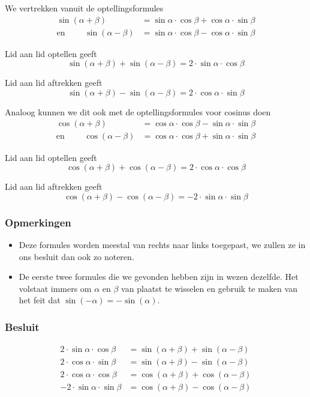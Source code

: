 \documentclass[twoside,a4paper,12pt]{article}
\begin{document}
We vertrekken vanuit de optellingsformules
\begin{align*}
                   \sin(\alpha + \beta) &= \sin\alpha\cdot\cos\beta + \cos\alpha\cdot\sin\beta\\
  \mbox{en }\qquad \sin(\alpha - \beta) &= \sin\alpha\cdot\cos\beta - \cos\alpha\cdot\sin\beta
\end{align*}

Lid aan lid optellen geeft
$$\sin(\alpha+\beta) + \sin(\alpha - \beta) = 2\cdot\sin\alpha\cdot\cos\beta$$

Lid aan lid aftrekken geeft
$$\sin(\alpha+\beta) - \sin(\alpha - \beta) = 2\cdot\cos\alpha\cdot\sin\beta$$

Analoog kunnen we dit ook met de optellingsformules voor cosinus doen
\begin{align*}
                   \cos(\alpha + \beta) &= \cos\alpha\cdot\cos\beta - \sin\alpha\cdot\sin\beta\\
  \mbox{en }\qquad \cos(\alpha - \beta) &= \cos\alpha\cdot\cos\beta + \sin\alpha\cdot\sin\beta
\end{align*}

Lid aan lid optellen geeft
$$\cos(\alpha+\beta) + \cos(\alpha - \beta) = 2\cdot\cos\alpha\cdot\cos\beta$$

Lid aan lid aftrekken geeft
$$\cos(\alpha+\beta) - \cos(\alpha - \beta) = -2\cdot\sin\alpha\cdot\sin\beta$$

\subsubsection*{Opmerkingen}
\begin{itemize}
  \item Deze formules worden meestal van rechts naar links toegepast, we zullen ze in ons besluit dan ook zo noteren.
  \item De eerste twee formules die we gevonden hebben zijn in wezen dezelfde. Het volstaat immers om $\alpha$ en $\beta$ van plaatst te wisselen en gebruik te maken van het feit dat $\sin(-\alpha)=-\sin(\alpha)$.
\end{itemize}

\subsubsection*{Besluit}
\begin{align*}
  2\cdot \sin\alpha\cdot \cos\beta &= \sin(\alpha+\beta)+\sin(\alpha-\beta)\\
  2\cdot \cos\alpha\cdot \sin\beta &= \sin(\alpha+\beta)-\sin(\alpha-\beta)\\
  2\cdot \cos\alpha\cdot \cos\beta &= \cos(\alpha+\beta)+\cos(\alpha-\beta)\\
  - 2\cdot \sin\alpha\cdot \sin\beta &= \cos(\alpha+\beta)-\cos(\alpha-\beta)
\end{align*}
\end{document}
